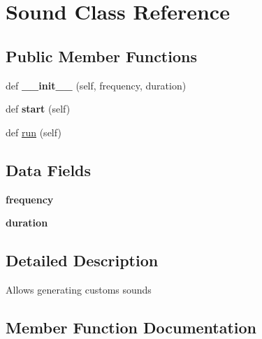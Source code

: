 \hypertarget{classsound_1_1_sound}{}\section{Sound Class Reference}
\label{classsound_1_1_sound}
\subsection*{Public Member Functions}
\begin{DoxyCompactItemize}
\item 
\mbox{\label{classsound_1_1_sound_ad296a3566bab38b1183e1c6644d24c26}} 
def {\bfseries \+\_\+\+\_\+init\+\_\+\+\_\+} (self, frequency, duration)
\item 
\mbox{\label{classsound_1_1_sound_af1af6ddf04f00f958949618f79c33b82}} 
def {\bfseries start} (self)
\item 
def \mbox{\hyperlink{classsound_1_1_sound_ad22709b2e67308af35f55680d5a026e0}{run}} (self)
\end{DoxyCompactItemize}
\subsection*{Data Fields}
\begin{DoxyCompactItemize}
\item 
\mbox{\label{classsound_1_1_sound_abc7c2b8fc0432e1f1f6f07123a99a4a2}} 
{\bfseries frequency}
\item 
\mbox{\label{classsound_1_1_sound_a71f530f1f32dbca56a6af8a5fbbfbe49}} 
{\bfseries duration}
\end{DoxyCompactItemize}


\subsection{Detailed Description}
\begin{DoxyVerb}Allows generating customs sounds\end{DoxyVerb}
 

\subsection{Member Function Documentation}
\mbox{\label{classsound_1_1_sound_ad22709b2e67308af35f55680d5a026e0}} 
